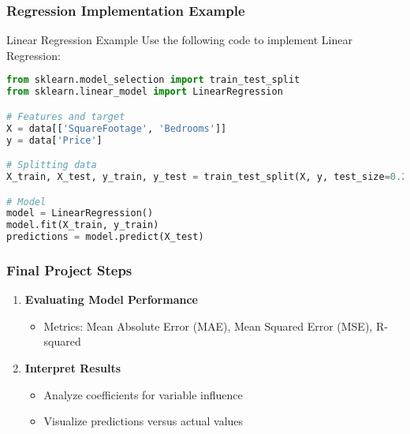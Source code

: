 \documentclass[aspectratio=169]{beamer}
\begin{document}
\begin{frame}[fragile]
    \frametitle{Regression Implementation Example}
    \begin{block}{Linear Regression Example}
        Use the following code to implement Linear Regression:
        \begin{lstlisting}[language=Python]
from sklearn.model_selection import train_test_split
from sklearn.linear_model import LinearRegression

# Features and target
X = data[['SquareFootage', 'Bedrooms']]
y = data['Price']

# Splitting data
X_train, X_test, y_train, y_test = train_test_split(X, y, test_size=0.2, random_state=42)

# Model
model = LinearRegression()
model.fit(X_train, y_train)
predictions = model.predict(X_test)
        \end{lstlisting}
    \end{block}
\end{frame}

\begin{frame}
    \frametitle{Final Project Steps}
    \begin{enumerate}[resume]
        \item \textbf{Evaluating Model Performance}
            \begin{itemize}
                \item Metrics: Mean Absolute Error (MAE), Mean Squared Error (MSE), R-squared
            \end{itemize}

        \item \textbf{Interpret Results}
            \begin{itemize}
                \item Analyze coefficients for variable influence
                \item Visualize predictions versus actual values
            \end{itemize}
    \end{enumerate}
\end{frame}
\end{document}

